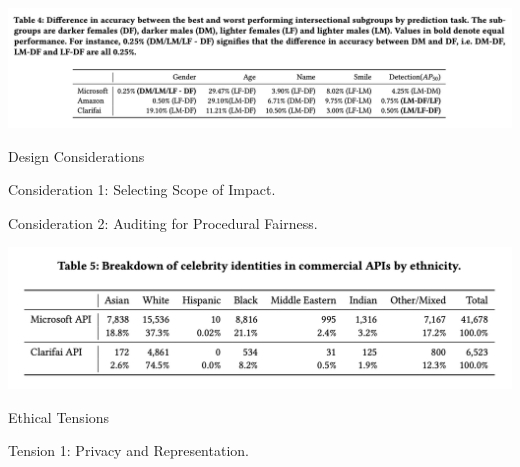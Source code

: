 \documentclass{beamer}
\begin{document}
\begin{frame}
    \centering
    \includegraphics[width=\textwidth]{static/results_two.png}
\end{frame}

\begin{frame}
    \begin{center}
    \LARGE{Design Considerations}
    \end{center}
\end{frame}

\begin{frame}
    \begin{center}
    \LARGE{Consideration 1: Selecting Scope of Impact.}
    \end{center}
\end{frame}

\begin{frame}
    \begin{center}
    \LARGE{Consideration 2: Auditing for Procedural Fairness. }
    \end{center}
\end{frame}

\begin{frame}
    \centering
    \includegraphics[width=\textwidth]{static/table_five.png}
\end{frame}

\begin{frame}
    \begin{center}
    \LARGE{Ethical Tensions}
    \end{center}
\end{frame}

\begin{frame}
    \begin{center}
    \LARGE{Tension 1: Privacy and Representation.}
    \end{center}
\end{frame}
\end{document}
